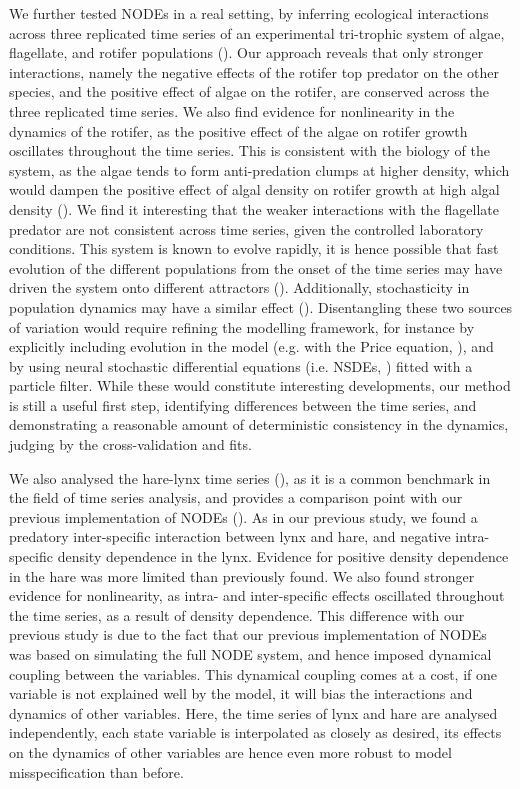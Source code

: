 \documentclass[11pt, oneside]{article}
\begin{document}
We further tested NODEs in a real setting, by inferring ecological interactions across three replicated time series of an experimental tri-trophic system of algae, flagellate, and rotifer populations (\cite{Hiltunen2013}). 
Our approach reveals that only stronger interactions, namely the negative effects of the rotifer top predator on the other species, and the positive effect of algae on the rotifer, are conserved across the three replicated time series.
We also find evidence for nonlinearity in the dynamics of the rotifer, as the positive effect of the algae on rotifer growth oscillates throughout the time series. 
This is consistent with the biology of the system, as the algae tends to form anti-predation clumps at higher density, which would dampen the positive effect of algal density on rotifer growth at high algal density (\cite{Yoshida2003,Hiltunen2013}).
We find it interesting that the weaker interactions with the flagellate predator are not consistent across time series, given the controlled laboratory conditions.
This system is known to evolve rapidly, it is hence possible that fast evolution of the different populations from the onset of the time series may have driven the system onto different attractors (\cite{Yoshida2003,Yoshida2007,Hiltunen2013}).
Additionally, stochasticity in population dynamics may have a similar effect (\cite{Dallas2021}).
Disentangling these two sources of variation would require refining the modelling framework, for instance by explicitly including evolution in the model (e.g. with the Price equation, \cite{Ellner2011}), and by using neural stochastic differential equations (i.e. NSDEs, \cite{Rackauckas2019}) fitted with a particle filter. 
While these would constitute interesting developments, our method is still a useful first step, identifying differences between the time series, and demonstrating a reasonable amount of deterministic consistency in the dynamics, judging by the cross-validation and fits.

We also analysed the hare-lynx time series (\cite{Odum1972}), as it is a common benchmark in the field of time series analysis, and provides a comparison point with our previous implementation of NODEs (\cite{Bonnaffe2021a}).
As in our previous study, we found a predatory inter-specific interaction between lynx and hare, and negative intra-specific density dependence in the lynx.
Evidence for positive density dependence in the hare was more limited than previously found.
We also found stronger evidence for nonlinearity, as intra- and inter-specific effects oscillated throughout the time series, as a result of density dependence.
This difference with our previous study is due to the fact that our previous implementation of NODEs was based on simulating the full NODE system, and hence imposed dynamical coupling between the variables.
This dynamical coupling comes at a cost, if one variable is not explained well by the model, it will bias the interactions and dynamics of other variables.
Here, the time series of lynx and hare are analysed independently, each state variable is interpolated as closely as desired, its effects on the dynamics of other variables are hence even more robust to model misspecification than before.
\end{document}
